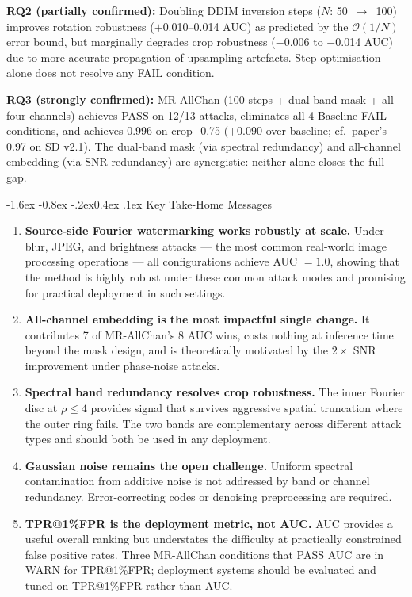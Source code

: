 \documentclass[10pt,twocolumn]{article}
\makeatletter
\renewcommand\subsection{\@startsection{subsection}{2}{\z@}%
  {-1.6ex \@plus -0.8ex \@minus -.2ex}{0.4ex \@plus .1ex}%
  {\normalfont\normalsize\itshape}}
\makeatother
\begin{document}
\textbf{RQ2 (partially confirmed):}
Doubling DDIM inversion steps ($N$: 50~$\to$~100) improves rotation
robustness ($+$0.010--0.014 AUC) as predicted by the $\mathcal{O}(1/N)$
error bound, but marginally degrades crop robustness ($-$0.006 to
$-$0.014 AUC) due to more accurate propagation of upsampling artefacts.
Step optimisation alone does not resolve any FAIL condition.

\textbf{RQ3 (strongly confirmed):}
MR-AllChan (100 steps + dual-band mask + all four channels) achieves
PASS on 12/13 attacks, eliminates all 4 Baseline FAIL conditions, and
achieves 0.996 on crop\_0.75 ($+$0.090 over baseline; cf.\ paper's 0.97 on SD v2.1).
The dual-band mask (via spectral redundancy) and all-channel embedding
(via SNR redundancy) are synergistic: neither alone closes the full gap.

\subsection{Key Take-Home Messages}

\begin{enumerate}
  \item \textbf{Source-side Fourier watermarking works robustly at scale.}
    Under blur, JPEG, and brightness attacks --- the most common
    real-world image processing operations --- all configurations
    achieve AUC $= 1.0$, showing that the method is highly robust 
    under these common attack modes and promising for practical
    deployment in such settings.

  \item \textbf{All-channel embedding is the most impactful single change.}
    It contributes 7 of MR-AllChan's 8 AUC wins, costs nothing at
    inference time beyond the mask design, and is theoretically motivated
    by the $2\times$ SNR improvement under phase-noise attacks.

  \item \textbf{Spectral band redundancy resolves crop robustness.}
    The inner Fourier disc at $\rho \le 4$ provides signal that survives
    aggressive spatial truncation where the outer ring fails.
    The two bands are complementary across different attack types and
    should both be used in any deployment.

  \item \textbf{Gaussian noise remains the open challenge.}
    Uniform spectral contamination from additive noise is not addressed
    by band or channel redundancy.
    Error-correcting codes or denoising preprocessing are required.

  \item \textbf{TPR@1\%FPR is the deployment metric, not AUC.}
    AUC provides a useful overall ranking but understates the difficulty
    at practically constrained false positive rates.
    Three MR-AllChan conditions that PASS AUC are in WARN for
    TPR@1\%FPR; deployment systems should be evaluated and tuned
    on TPR@1\%FPR rather than AUC.
\end{enumerate}
\end{document}
